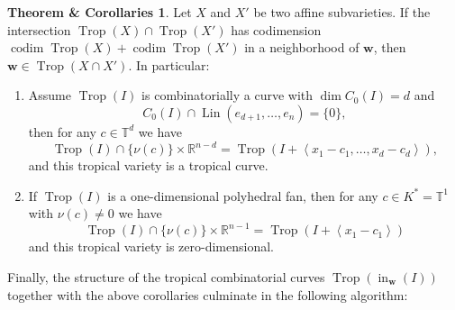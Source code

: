 \documentclass[
  paper=a4,
  titlepage,
  bibliography=totoc,
  pagesize=pdftex
]{scrartcl}
\numberwithin{figure}{section}
\numberwithin{equation}{section}
\numberwithin{table}{section}
\newcommand*\setR{\mathds{R}}
\newcommand*\setT{\mathds{T}}
\newcommand*\ideal[1]{\left\langle #1 \right\rangle}
\let\vec\mathbf
\DeclareMathOperator{\Trop}{Trop}
\DeclareMathOperator{\initial}{in}
\DeclareMathOperator{\Lin}{Lin}
\DeclareMathOperator{\codim}{codim}
\theoremstyle{definition}
\newtheorem{thmCorollary}[definition]{Theorem \& Corollaries}
\numberwithin{definition}{section}
\begin{document}
\begin{thmCorollary} \label{thmc:tropInt}
  Let $X$ and $X'$ be two affine subvarieties. If the intersection $\Trop(X) \cap
  \Trop(X')$ has codimension $\codim\Trop(X) + \codim\Trop(X')$ in a neighborhood of $\vec
  w$, then $\vec w \in \Trop(X\cap X')$. In particular:
  \begin{enumerate}
    \item Assume $\Trop(I)$ is combinatorially a curve with $\dim C_0(I) = d$ and
      \[
        C_0(I)\cap \Lin(e_{d+1}, \dots, e_n) = \{0\},
      \]
      then for any $c \in \setT^d$ we have
      \[
        \Trop(I) \cap \{\nu(c)\} \times \setR^{n-d} = \Trop(I + \ideal{x_1-c_1, \dots,
        x_d-c_d}),
      \]
      and this tropical variety is a tropical curve.
      \label{thmc:i}
    \item If $\Trop(I)$ is a one-dimensional polyhedral fan, then for any $c \in K^* =
      \setT^1$ with $\nu(c)\neq0$ we have
      \[
        \Trop(I) \cap \{\nu(c)\} \times \setR^{n-1} = \Trop(I + \ideal{x_1-c_1})
      \]
      and this tropical variety is zero-dimensional.
      \label{thmc:ii}
  \end{enumerate}
\end{thmCorollary}

Finally, the structure of the tropical combinatorial curves $\Trop(\initial_{\vec w}(I))$ together
with the above corollaries culminate in the following algorithm:
\end{document}
